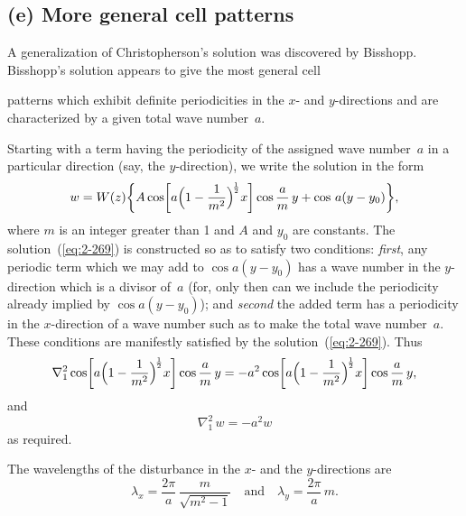 \subsection*{(e) More general cell patterns}

A generalization of Christopherson's solution was discovered by
Bisshopp. Bisshopp's solution appears to give the most general cell


\noindent
patterns which exhibit definite periodicities in the $x$- and $y$-directions
and are characterized by a given total wave number~$a$.

Starting with a term having the periodicity of the assigned wave
number~$a$ in a particular direction (say, the $y$-direction), we write the
solution in the form
\begin{equation}
\label{eq:2-269}
w = W(z)\biggl\{A\cos\biggl[a\Bigl(1-\frac{1}{m^2}\Bigr)^{\!\frac{1}{2}}x\biggr]\cos\frac{a}{m}\,y + \cos\,a(y-y_0)\biggr\},
\end{equation}
where $m$ is an integer greater than 1 and $A$ and $y_0$ are constants. The
solution~(\ref{eq:2-269}) is constructed so as to satisfy two conditions: \emph{first}, any
periodic term which we may add to $\cos a(y-y_0)$ has a wave number in
the $y$-direction which is a divisor of~$a$ (for, only then can we include
the periodicity already implied by $\cos a(y-y_0)$); and \emph{second} the added term
has a periodicity in the $x$-direction of a wave number such as to make the
total wave number~$a$. These conditions are manifestly satisfied by the
solution~(\ref{eq:2-269}). Thus
\begin{equation}
\label{eq:2-270}
\nabla_1^2\cos\biggl[a\Bigl(1-\frac{1}{m^2}\Bigr)^{\!\frac{1}{2}}x\biggr]\cos\frac{a}{m}\,y = -a^2\cos\biggl[a\Bigl(1-\frac{1}{m^2}\Bigr)^{\!\frac{1}{2}}x\biggr]\cos\frac{a}{m}\,y,
\end{equation}
and
\begin{equation}
\label{eq:2-271}
\nabla_1^2\,w = -a^2 w
\end{equation}
as required.

The wavelengths of the disturbance in the $x$- and the $y$-directions are
\begin{equation}
\label{eq:2-272}
\lambda_x = \frac{2\pi}{a}\,\frac{m}{\sqrt{m^2-1}} \quad\text{and}\quad \lambda_y = \frac{2\pi}{a}\,m.
\end{equation}

